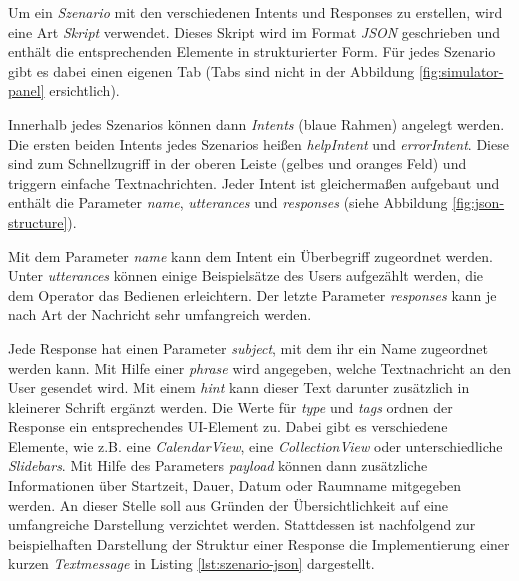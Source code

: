Um ein \textit{Szenario} mit den verschiedenen Intents und Responses zu erstellen, wird eine Art \textit{Skript} verwendet. Dieses Skript wird im Format \textit{\ac{JSON}} geschrieben und enthält die entsprechenden Elemente in strukturierter Form. Für jedes Szenario gibt es dabei einen eigenen Tab (Tabs sind nicht in der Abbildung \ref{fig:simulator-panel} ersichtlich). 

Innerhalb jedes Szenarios können dann \textit{Intents} (blaue Rahmen) angelegt werden. Die ersten beiden Intents jedes Szenarios heißen \textit{helpIntent} und \textit{errorIntent}. Diese sind zum Schnellzugriff in der oberen Leiste (gelbes und oranges Feld) und triggern einfache Textnachrichten. Jeder Intent ist gleichermaßen aufgebaut und enthält die Parameter \textit{name}, \textit{utterances} und \textit{responses} (siehe Abbildung \ref{fig:json-structure}). 

Mit dem Parameter \textit{name} kann dem Intent ein Überbegriff zugeordnet werden. Unter \textit{utterances} können einige Beispielsätze des Users aufgezählt werden, die dem Operator das Bedienen erleichtern. Der letzte Parameter \textit{responses} kann je nach Art der Nachricht sehr umfangreich werden. 

Jede Response hat einen Parameter \textit{subject}, mit dem ihr ein Name zugeordnet werden kann. Mit Hilfe einer \textit{phrase} wird angegeben, welche Textnachricht an den User gesendet wird. Mit einem \textit{hint} kann dieser Text darunter zusätzlich in kleinerer Schrift ergänzt werden. Die Werte für \textit{type} und \textit{tags} ordnen der Response ein entsprechendes \ac{UI}-Element zu. Dabei gibt es verschiedene Elemente, wie z.B. eine \textit{CalendarView}, eine \textit{CollectionView} oder unterschiedliche \textit{Slidebars}. Mit Hilfe des Parameters \textit{payload} können dann zusätzliche Informationen über Startzeit, Dauer, Datum oder Raumname mitgegeben werden. An dieser Stelle soll aus Gründen der Übersichtlichkeit auf eine umfangreiche Darstellung verzichtet werden. Stattdessen ist nachfolgend zur beispielhaften Darstellung der Struktur einer Response die Implementierung einer kurzen \textit{Textmessage} in Listing \ref{lst:szenario-json} dargestellt. 
\newline

